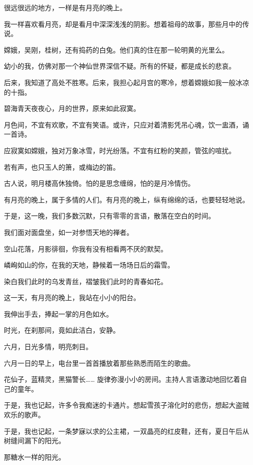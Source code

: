 		很远很远的地方，一样是有月亮的晚上。\par
		我一样喜欢看月亮，却是看月中深深浅浅的阴影。想着祖母的故事，那些月中的传说。\par
		嫦娥，吴刚，桂树，还有捣药的白兔。他们真的住在那一轮明黄的光里么。\par
		幼小的我，仿佛对那一个神仙世界深信不疑。所有的怀疑，都是成长的悲哀。\par
		后来，我知道了高处不胜寒。后来，我担心起月宫的寒冷，想着嫦娥如我一般冰凉的十指。\par
		碧海青天夜夜心，月的世界，原来如此寂寞。\par
		月色间，不宜有欢歌，不宜有笑语。或许，只应对着清影凭吊心魂，饮一盅酒，诵一首诗。\par
		应寂寞如嫦娥，独对万象冰雪，时光纷落。不宜有红粉的笑颜，管弦的喧扰。\par
		若有声，也只玉人的箫，或梅边的笛。\par
		古人说，明月楼高休独倚。怕的是思念缠绵，怕的是月冷情伤。\par
		有月亮的晚上，属于多情的人们。有月亮的晚上，纵有绵绵的话，也要轻轻地说。\par
		于是，这一晚，我们多数沉默，只有零零的言语，散落在空白的时间。\par
		我们面对面盘坐，如一对参悟天地的禅者。\par
		空山花落，月影徘徊，你我有没有相看两不厌的默契。\par
		嶙峋如山的你，在我的天地，静候着一场场日后的霜雪。\par
		染白我们此时的乌发青丝，褶皱我们此时的青春如花。

		这一天，有月亮的晚上，我站在小小的阳台。\par
		我伸出手去，捧起一掌的月色如水。\par
		时光，在刹那间，竟如此洁白，安静。

	\endwriting



		六月，日光多情，明亮刺目。


		\vspace{1em}
		六月一日的早上，电台里一首首播放着那些熟悉而陌生的歌曲。\par
		花仙子，蓝精灵，黑猫警长…… 旋律弥漫小小的房间。主持人言语激动地回忆着自己的童年。\par
		于是，我也记起，许多令我痴迷的卡通片。想起雪孩子溶化时的悲伤，想起大盗贼欢乐的歌声。\par
		于是，我也记起，一条梦寐以求的公主裙，一双晶亮的红皮鞋，还有，夏日午后从树缝间漏下的阳光。\par
		那糖水一样的阳光。

